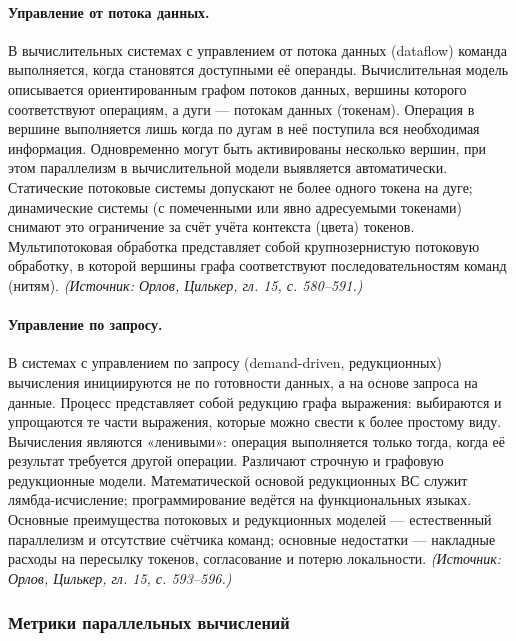\documentclass[a4paper,12pt]{article}
\begin{document}
\paragraph{Управление от потока данных.}
В вычислительных системах с управлением от потока данных (dataflow) команда выполняется, когда становятся доступными её операнды. Вычислительная модель описывается ориентированным графом потоков данных, вершины которого соответствуют операциям, а дуги — потокам данных (токенам). Операция в вершине выполняется лишь когда по дугам в неё поступила вся необходимая информация. Одновременно могут быть активированы несколько вершин, при этом параллелизм в вычислительной модели выявляется автоматически. Статические потоковые системы допускают не более одного токена на дуге; динамические системы (с помеченными или явно адресуемыми токенами) снимают это ограничение за счёт учёта контекста (цвета) токенов. Мультипотоковая обработка представляет собой крупнозернистую потоковую обработку, в которой вершины графа соответствуют последовательностям команд (нитям).
\textit{(Источник: Орлов, Цилькер, гл. 15, с. 580--591.)}

\paragraph{Управление по запросу.}
В системах с управлением по запросу (demand-driven, редукционных) вычисления инициируются не по готовности данных, а на основе запроса на данные. Процесс представляет собой редукцию графа выражения: выбираются и упрощаются те части выражения, которые можно свести к более простому виду. Вычисления являются «ленивыми»: операция выполняется только тогда, когда её результат требуется другой операции. Различают строчную и графовую редукционные модели. Математической основой редукционных ВС служит лямбда-исчисление; программирование ведётся на функциональных языках. Основные преимущества потоковых и редукционных моделей — естественный параллелизм и отсутствие счётчика команд; основные недостатки — накладные расходы на пересылку токенов, согласование и потерю локальности.
\textit{(Источник: Орлов, Цилькер, гл. 15, с. 593--596.)}

\subsubsection{Метрики параллельных вычислений}
\end{document}
